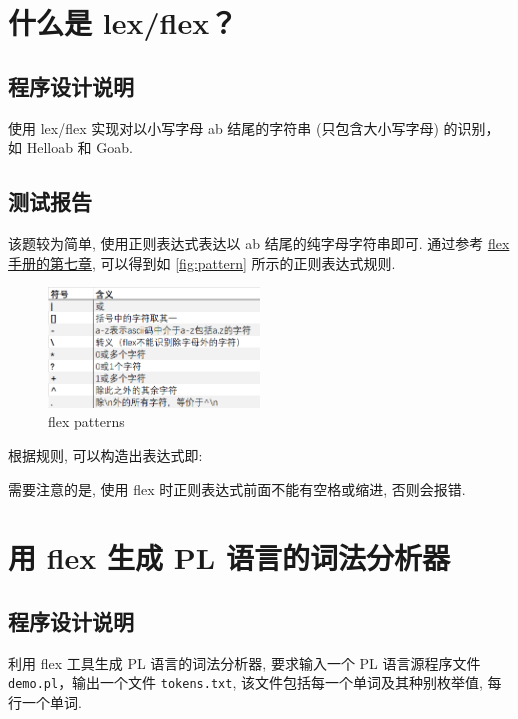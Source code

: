 \section{什么是 lex/flex？}

\subsection{程序设计说明}

使用 lex/flex 实现对以小写字母 ab 结尾的字符串 (只包含大小写字母) 的识别，如 Helloab 和 Goab.

\subsection{测试报告}

该题较为简单, 使用正则表达式表达以 ab 结尾的纯字母字符串即可. 通过参考 \href{https://westes.github.io/flex/manual/}{flex 手册的第七章}, 可以得到如 \autoref{fig:pattern} 所示的正则表达式规则. \begin{figure}[htbp]
    \centering
    \includegraphics[width=0.5\textwidth]{images/pattern.png}
    \caption{flex patterns}
    \label{fig:pattern}
\end{figure}

根据规则, 可以构造出表达式即: 

需要注意的是, 使用 flex 时正则表达式前面不能有空格或缩进, 否则会报错.

\section{用 flex 生成 PL 语言的词法分析器}

\subsection{程序设计说明}

利用 flex 工具生成 PL 语言的词法分析器, 要求输入一个 PL 语言源程序文件 \texttt{demo.pl}，输出一个文件 \texttt{tokens.txt}, 该文件包括每一个单词及其种别枚举值, 每行一个单词.

